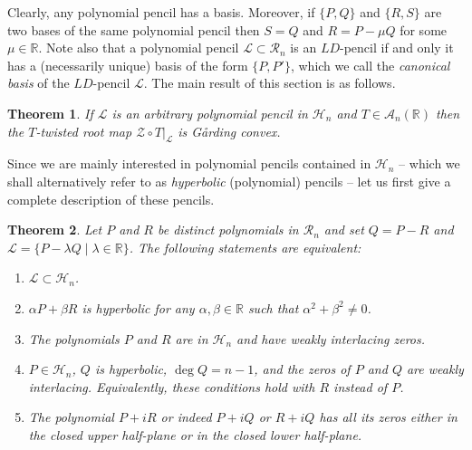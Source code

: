 \documentclass[10pt,twoside,a4paper,reqno]{amsart}
\theoremstyle{plain}
\newtheorem{theo+}           {Theorem}
\theoremstyle{definition}
\theoremstyle{remark}
\newenvironment{theorem}{\begin{theo+}}{\end{theo+}}
\newcommand {\bR} {\mathbb {R}}
\newcommand {\al} {\alpha}
\newcommand {\be} {\beta}
\newcommand {\la} {\lambda}
\newcommand {\calL} {\mathcal {L}}
\newcommand {\calH} {\mathcal {H}}
\newcommand {\calR} {\mathcal {R}}
\newcommand {\calA} {\mathcal {A}}
\newcommand {\calZ} {\mathcal {Z}}
\begin{document}
Clearly, any polynomial pencil has a basis. Moreover, 
if $\{P,Q\}$ and $\{R,S\}$ are two bases of the same polynomial pencil
then $S=Q$ and $R=P-\mu Q$ for some $\mu\in \bR$. Note also that a 
polynomial pencil $\calL\subset \calR_n$ is an $LD$-pencil if and only it has 
a (necessarily 
unique) basis of the form $\{P,P'\}$, which we call the
{\em canonical basis} of the $LD$-pencil $\calL$.
The main result of this section is as follows.

\begin{theorem}\label{GC}
If $\calL$ is an arbitrary polynomial pencil in $\calH_n$ and 
$T\in \calA_n(\bR)$ then the $T$-twisted 
root map $\calZ\circ T|_{\calL}$ is G\aa rding convex.
\end{theorem}

Since we are mainly interested in polynomial pencils contained in 
$\calH_n$ -- which we shall alternatively refer to as {\em hyperbolic} 
(polynomial) 
pencils -- let us first give a complete description of these pencils. 

\begin{theorem}\label{desc}
Let $P$ and $R$ be distinct polynomials in $\calR_n$ and set $Q=P-R$ and 
$\calL=\{P-\la Q\mid\la \in \bR\}$. The following statements are equivalent:
\begin{enumerate}
\item[(i)] $\calL\subset \calH_n$.
\item[(ii)] $\al P+\be R$ is hyperbolic for any $\al, \be\in \bR$ such 
that $\al^2+\be^2\neq 0$.
\item[(iii)] The polynomials $P$ and $R$ are in $\calH_n$ and have weakly 
interlacing zeros.
\item[(iv)] $P\in \calH_n$, $Q$ is hyperbolic, $\deg Q=n-1$, and the zeros of 
$P$ and $Q$ are weakly interlacing. Equivalently, these conditions hold with 
$R$ instead of $P$.
\item[(v)] The polynomial $P+iR$ or indeed $P+iQ$ or $R+iQ$ has all its zeros 
either in the closed upper half-plane or in the closed lower half-plane.
\end{enumerate}
\end{theorem}
\end{document}
